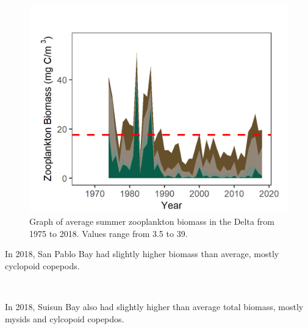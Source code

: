 \documentclass[
]{book}
\begin{document}
\begin{panel-grid}
\begin{columns-nocenter}
\begin{column800}
\begin{expand}
\begin{figure}
\includegraphics[width=15.25in]{figures/zoops_dtsummer} \caption{Graph of average summer zooplankton biomass in the Delta from 1975 to 2018. Values range from 3.5 to 39.}\label{fig:unnamed-chunk-72}
\end{figure}

\end{expand}

\end{column800}

\end{columns-nocenter}

\begin{columns-nocenter}

\begin{column800}

In 2018, San Pablo Bay had slightly higher biomass than average, mostly cyclopoid copepods.

\end{column800}

\begin{column40}

~

\end{column40}

\begin{column800}

In 2018, Suisun Bay also had slightly higher than average total biomass, mostly mysids and cylcopoid copepdos.

\end{column800}


\end{columns-nocenter}
\end{panel-grid}
\end{document}
